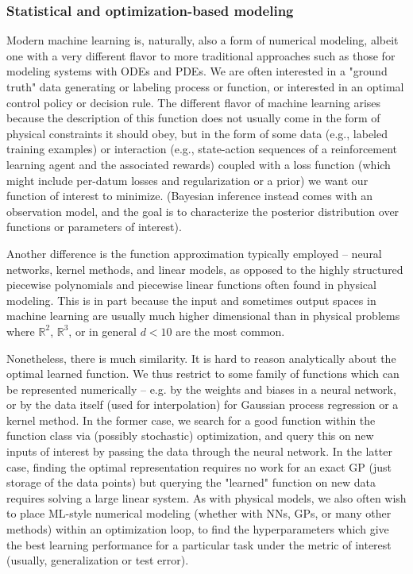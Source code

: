 \documentclass{puthesis}
\begin{document}
\subsubsection{Statistical and optimization-based modeling}
Modern machine learning is, naturally, also a form of numerical modeling,
albeit one with a very different flavor to more traditional approaches such as those
for modeling systems with ODEs and PDEs.
We are often interested in a "ground truth" data generating or labeling process or
function, or interested in an optimal control policy or decision rule.
The different flavor of machine learning arises because the description of this function
does not usually come in the form of physical constraints it should obey,
but in the form of some data (e.g., labeled training examples) or interaction
(e.g., state-action sequences of a reinforcement learning agent and the associated
rewards) coupled with a loss function (which might include per-datum losses and
regularization or a prior) we want our function of interest to minimize.
(Bayesian inference instead comes with an observation model, and the goal is to
characterize the posterior distribution over functions or parameters of interest).

Another difference is the function approximation typically employed --
neural networks, kernel methods, and linear models, as opposed to the highly structured
piecewise polynomials and piecewise linear functions often found in physical modeling.
This is in part because the input and sometimes output spaces in machine learning are
usually much higher dimensional than in physical problems where $\mathbb{R}^2$,
$\mathbb{R}^3$, or in general $d < 10$ are the most common.

Nonetheless, there is much similarity. It is hard to reason analytically about the
optimal learned function.
We thus restrict to some family of functions which can be
represented numerically -- e.g. by the weights and biases in a neural network, or
by the data itself (used for interpolation) for Gaussian process regression or a
kernel method.
In the former case, we search for a good function within the function class via
(possibly stochastic) optimization, and query this on new inputs of interest
by passing the data through the neural network.
In the latter case, finding the optimal representation requires no work for an exact GP
(just storage of the data points) but querying the
"learned" function on new data requires solving a large linear system. As with physical models,
we also often wish to place ML-style numerical modeling (whether with NNs, GPs, or
many other methods) within an optimization loop, to find the hyperparameters which give
the best learning performance for a particular task under the metric of interest
(usually, generalization or test error).
\end{document}
